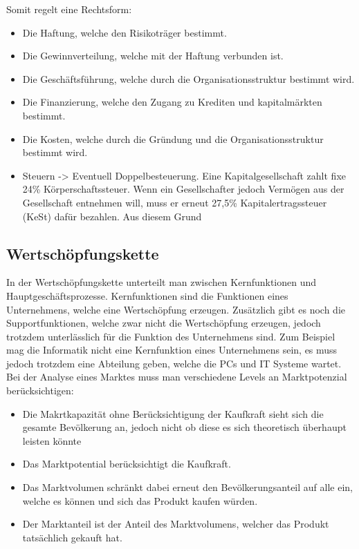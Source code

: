 \documentclass{article}
\begin{document}
	Somit regelt eine Rechtsform:
	\begin{itemize}
		\item{Die Haftung, welche den Risikoträger bestimmt.}
		\item{Die Gewinnverteilung, welche mit der Haftung verbunden ist.}
		\item{Die Geschäftsführung, welche durch die Organisationsstruktur bestimmt wird.}
		\item{Die Finanzierung, welche den Zugang zu Krediten und kapitalmärkten bestimmt.}
		\item{Die Kosten, welche durch die Gründung und die Organisationsstruktur bestimmt wird.}
		\item{Steuern -> Eventuell Doppelbesteuerung. Eine Kapitalgesellschaft zahlt fixe 24\% Körperschaftssteuer. Wenn ein Gesellschafter jedoch Vermögen aus der Gesellschaft entnehmen will, muss er erneut 27,5\% Kapitalertragssteuer (KeSt) dafür bezahlen. Aus diesem Grund}
	\end{itemize}
	\subsection{Wertschöpfungskette}
	In der Wertschöpfungskette unterteilt man zwischen Kernfunktionen und Hauptgeschäftsprozesse. Kernfunktionen sind die Funktionen eines Unternehmens, welche eine Wertschöpfung erzeugen. Zusätzlich gibt es noch die Supportfunktionen, welche zwar nicht die Wertschöpfung erzeugen, jedoch trotzdem unterlässlich für die Funktion des Unternehmens sind. Zum Beispiel mag die Informatik nicht eine Kernfunktion eines Unternehmens sein, es muss jedoch trotzdem eine Abteilung geben, welche die PCs und IT Systeme wartet. \\
	Bei der Analyse eines Marktes muss man verschiedene Levels an Marktpotenzial berücksichtigen:
	\begin{itemize}
		\item{Die Makrtkapazität ohne Berücksichtigung der Kaufkraft sieht sich die gesamte Bevölkerung an, jedoch nicht ob diese es sich theoretisch überhaupt leisten könnte}
		\item{Das Marktpotential berücksichtigt die Kaufkraft.}
		\item{Das Marktvolumen schränkt dabei erneut den Bevölkerungsanteil auf alle ein, welche es können und sich das Produkt kaufen würden.}
		\item{Der Marktanteil ist der Anteil des Marktvolumens, welcher das Produkt tatsächlich gekauft hat.}
	\end{itemize}
\end{document}
